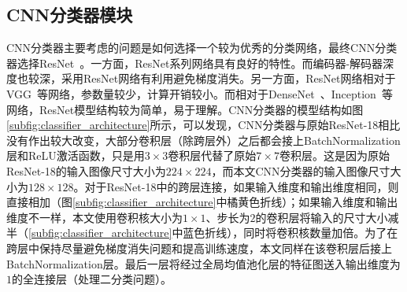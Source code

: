 \subsection{CNN分类器模块}\label{subsec:cnn_classifier_model}
CNN分类器主要考虑的问题是如何选择一个较为优秀的分类网络，最终CNN分类器选择ResNet~\cite{he2016deep}。一方面，ResNet系列网络具有良好的特性。而编码器-解码器深度也较深，采用ResNet网络有利用避免梯度消失。另一方面，ResNet网络相对于VGG~\cite{simonyan2014very}等网络，参数量较少，计算开销较小。而相对于DenseNet~\cite{huang2017densely}、Inception~\cite{Szegedy2015RethinkingTI}等网络，ResNet模型结构较为简单，易于理解。CNN分类器的模型结构如图\ref{subfig:classifier_architecture}所示，可以发现，CNN分类器与原始ResNet-18相比没有作出较大改变，大部分卷积层（除跨层外）之后都会接上BatchNormalization层和ReLU激活函数，只是用$3\times 3$卷积层代替了原始$7\times 7$卷积层。这是因为原始ResNet-18的输入图像尺寸大小为$224\times 224$，而本文CNN分类器的输入图像尺寸大小为$128\times 128$。对于ResNet-18中的跨层连接，如果输入维度和输出维度相同，则直接相加（图\ref{subfig:classifier_architecture}中橘黄色折线）；如果输入维度和输出维度不一样，本文使用卷积核大小为$1\times 1$、步长为$2$的卷积层将输入的尺寸大小减半（\ref{subfig:classifier_architecture}中蓝色折线），同时将卷积核数量加倍。为了在跨层中保持尽量避免梯度消失问题和提高训练速度，本文同样在该卷积层后接上BatchNormalization层。最后一层将经过全局均值池化层的特征图送入输出维度为$1$的全连接层（处理二分类问题）。

